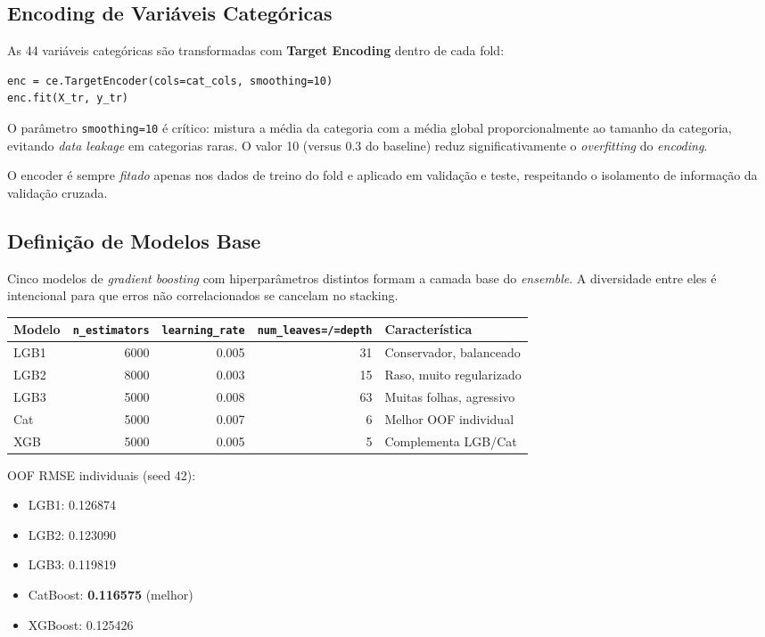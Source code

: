 \documentclass[11pt]{article}
\begin{document}
\subsection{Encoding de Variáveis Categóricas}
\label{sec:org49f4eb5}

As 44 variáveis categóricas são transformadas com \textbf{Target Encoding} dentro de cada fold:

\begin{verbatim}
enc = ce.TargetEncoder(cols=cat_cols, smoothing=10)
enc.fit(X_tr, y_tr)
\end{verbatim}

O parâmetro \texttt{smoothing=10} é crítico: mistura a média da categoria com a média global proporcionalmente ao tamanho da categoria, evitando \emph{data leakage} em categorias raras. O valor 10 (versus 0.3 do baseline) reduz significativamente o \emph{overfitting} do \emph{encoding}.

O encoder é sempre \emph{fitado} apenas nos dados de treino do fold e aplicado em validação e teste, respeitando o isolamento de
informação da validação cruzada.
\subsection{Definição de Modelos Base}
\label{sec:orgea9ca8f}
Cinco modelos de \emph{gradient boosting} com hiperparâmetros distintos formam a camada base do \emph{ensemble}. A diversidade entre eles é intencional para que erros não correlacionados se cancelam no stacking.

\begin{center}
\begin{tabular}{lrrrl}
Modelo & \texttt{n\_estimators} & \texttt{learning\_rate} & \texttt{num\_leaves=/=depth} & Característica\\
\hline
LGB1 & 6000 & 0.005 & 31 & Conservador, balanceado\\
LGB2 & 8000 & 0.003 & 15 & Raso, muito regularizado\\
LGB3 & 5000 & 0.008 & 63 & Muitas folhas, agressivo\\
Cat & 5000 & 0.007 & 6 & Melhor OOF individual\\
XGB & 5000 & 0.005 & 5 & Complementa LGB/Cat\\
\end{tabular}
\end{center}

OOF RMSE individuais (seed 42):
\begin{itemize}
\item LGB1: 0.126874
\item LGB2: 0.123090
\item LGB3: 0.119819
\item CatBoost: \textbf{0.116575} (melhor)
\item XGBoost: 0.125426
\end{itemize}
\end{document}
